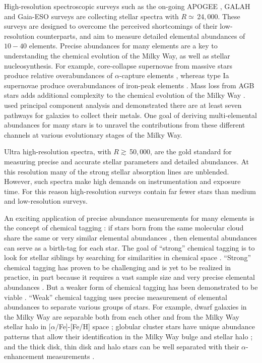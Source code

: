 \documentclass[iop]{emulateapj}
\begin{document}
\begin{CJK*}{UTF8}{gbsn}
High-resolution spectroscopic surveys such as the on-going APOGEE \citep{maj15}, GALAH \citep{des15} and Gaia-ESO \citep{smi14} surveys are collecting stellar spectra with $R \simeq \,$24$,$000. These surveys are designed to overcome the perceived shortcomings of their low-resolution counterparts, and aim to measure detailed elemental abundances of $10-40$ elements. Precise abundances for many elements are a key to understanding the chemical evolution of the Milky Way, as well as stellar nucleosynthesis. For example, core-collapse supernovae from massive stars produce relative overabundances of $\alpha$-capture elements \citep[e.g.,][]{woo95,lim03}, whereas type Ia supernovae produce overabundances of iron-peak elements \citep[e.g.,][also review from \citealt{nom13}]{iwa99}. Mass loss from AGB stars adds additional complexity to the chemical evolution of the Milky Way \citep[e.g.,][]{kar14,ven15}. \citet{tin12a} used principal component analysis and demonstrated there are at least seven pathways for galaxies to collect their metals. One goal of deriving multi-elemental abundances for many stars is to unravel the contributions from these different channels at various evolutionary stages of the Milky Way. 

Ultra high-resolution spectra, with $R \gtrsim \,$50$,$000, are the gold standard for measuring precise and accurate stellar parameters and detailed abundances. At this resolution many of the strong stellar absorption lines are unblended. However, such spectra make high demands on instrumentation and exposure time. For this reason high-resolution surveys \citep[e.g.,][]{fis05,ben14,jof14,jof15,bre15,hei15} contain far fewer stars than medium and low-resolution surveys.

An exciting application of precise abundance measurements for many elements is the concept of chemical tagging \citep{fre02}: if stars born from the same molecular cloud share the same or very similar elemental abundances \citep[as suggested by recent observational works][]{bov15,liu16}, then elemental abundances can serve as a birth-tag for each star. The goal of ``strong'' chemical tagging is to look for stellar siblings by searching for similarities in chemical space \citep{fre02}. ``Strong'' chemical tagging has proven to be challenging and is yet to be realized in practice, in part because it requires a vast sample size and very precise elemental abundances \citep{lin13,tin15a}. But a weaker form of chemical tagging has been demonstrated to be viable \citep[e.g.,][]{qui15,hog16,mar16}. ``Weak'' chemical tagging uses precise measurement of elemental abundances to separate various groups of stars. For example, dwarf galaxies in the Milky Way are separable both from each other and from the Milky Way stellar halo in [$\alpha$/Fe]-[Fe/H] space \citep[e.g.,][]{ven04}; globular cluster stars have unique abundance patterns that allow their identification in the Milky Way bulge and stellar halo \citep[e.g.,][]{mar10,schi16}; and the thick disk, thin disk and halo stars can be well separated with their $\alpha$-enhancement measurements \citep[e.g.,][]{haw15,hay15}.


\end{CJK*}
\end{document}
